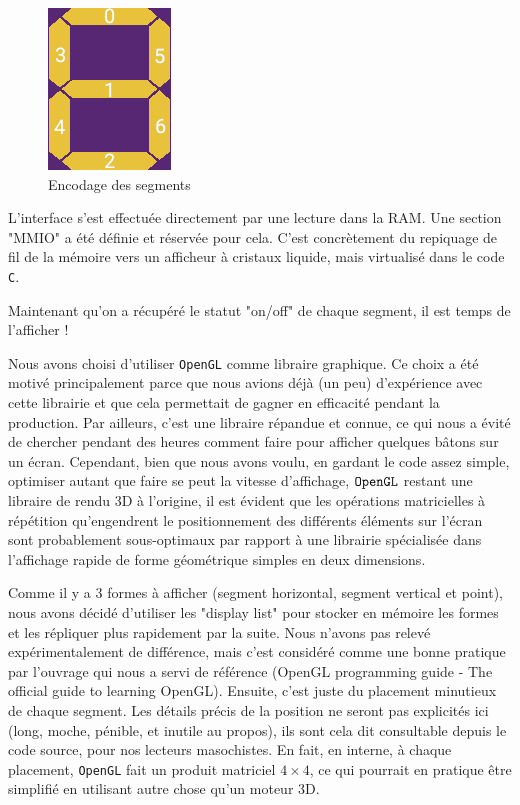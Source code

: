 \documentclass[10pt,a4paper,notitlepage ]{article}
\begin{document}
	\begin{figure}[h]
		\centering
		\includegraphics[width=0.3\linewidth]{segments}
		\caption{Encodage des segments}
		\label{fig:segments}
	\end{figure}
	
	L'interface s'est effectuée directement par une lecture dans la RAM. Une section "MMIO" a été définie et réservée pour cela. C'est concrètement du repiquage de fil de la mémoire vers un afficheur à cristaux liquide, mais virtualisé dans le code \texttt{C}.
	
	Maintenant qu'on a récupéré le statut "on/off" de chaque segment, il est temps de l'afficher !
	
	Nous avons choisi d'utiliser \texttt{OpenGL} comme libraire graphique. Ce choix a été motivé principalement parce que nous avions déjà (un peu) d'expérience avec cette librairie et que cela permettait de gagner en efficacité pendant la production. Par ailleurs, c'est une libraire répandue et connue, ce qui nous a évité de chercher pendant des heures comment faire pour afficher quelques bâtons sur un écran. Cependant, bien que nous avons voulu, en gardant le code assez simple, optimiser autant que faire se peut la vitesse d'affichage, $\tt{OpenGL}$ restant une libraire de rendu 3D à l'origine, il est évident que les opérations matricielles à répétition qu'engendrent le positionnement des différents éléments sur l'écran sont probablement sous-optimaux par rapport à une librairie spécialisée dans l'affichage rapide de forme géométrique simples en deux dimensions.
	
	Comme il y a 3 formes à afficher (segment horizontal, segment vertical et point), nous avons décidé d'utiliser les "display list" pour stocker en mémoire les formes et les répliquer plus rapidement par la suite. Nous n'avons pas relevé expérimentalement de différence, mais c'est considéré comme une bonne pratique par l'ouvrage qui nous a servi de référence (OpenGL programming guide - The official guide to learning OpenGL). Ensuite, c'est juste du placement minutieux de chaque segment. Les détails précis de la position ne seront pas explicités ici (long, moche, pénible, et inutile au propos), ils sont cela dit consultable depuis le code source, pour nos lecteurs masochistes. En fait, en interne, à chaque placement, \texttt{OpenGL} fait un produit matriciel $4\times 4$, ce qui pourrait en pratique être simplifié en utilisant autre chose qu'un moteur 3D.
	
\end{document}
